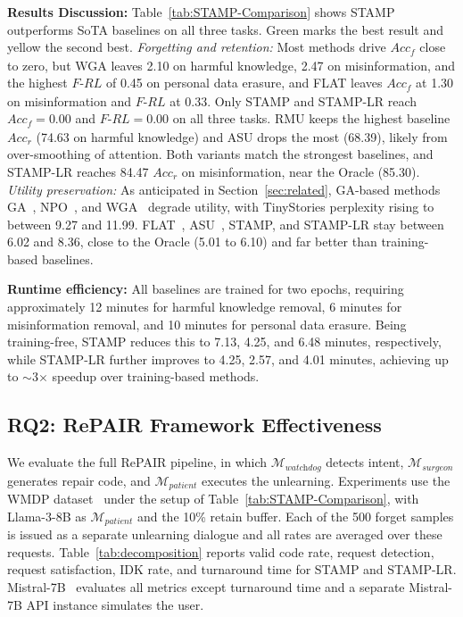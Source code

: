 \medskip
\noindent
\textbf{Results Discussion:}
Table~\ref{tab:STAMP-Comparison} shows STAMP outperforms SoTA baselines on all three tasks. \colorbox{green!30}{Green} marks the best result and \colorbox{yellow!40}{yellow} the second best.
\textit{Forgetting and retention:}
Most methods drive $Acc_\textit{f}$ close to zero, but WGA leaves 2.10 on harmful knowledge, 2.47 on misinformation, and the highest $F\text{-}RL$ of 0.45 on personal data erasure, and FLAT leaves $Acc_\textit{f}$ at 1.30 on misinformation and $F\text{-}RL$ at 0.33. Only STAMP and STAMP-LR reach $Acc_\textit{f} = 0.00$ and $F\text{-}RL = 0.00$ on all three tasks. RMU keeps the highest baseline $Acc_\textit{r}$ (74.63 on harmful knowledge) and ASU drops the most (68.39), likely from over-smoothing of attention. Both variants match the strongest baselines, and STAMP-LR reaches 84.47 $Acc_\textit{r}$ on misinformation, near the Oracle (85.30).
\textit{Utility preservation:}
As anticipated in Section~\ref{sec:related}, GA-based methods GA~\cite{yao2024large}, NPO~\cite{zhang2024negative}, and WGA~\cite{wang2025rethinking} degrade utility, with TinyStories perplexity rising to between 9.27 and 11.99. FLAT~\cite{wang2024llm}, ASU~\cite{zade2026attention}, STAMP, and STAMP-LR stay between 6.02 and 8.36, close to the Oracle (5.01 to 6.10) and far better than training-based baselines.

\noindent
\textbf{Runtime efficiency:}
All baselines are trained for two epochs, requiring approximately 12 minutes for harmful knowledge removal, 6 minutes for misinformation removal, and 10 minutes for personal data erasure. Being training-free, STAMP reduces this to 7.13, 4.25, and 6.48 minutes, respectively, while STAMP-LR further improves to 4.25, 2.57, and 4.01 minutes, achieving up to $\sim$3$\times$ speedup over training-based methods.

\subsection{RQ2: RePAIR Framework Effectiveness}

We evaluate the full RePAIR pipeline, in which $\mathcal{M}_{\textit{watchdog}}$ detects intent, $\mathcal{M}_{\textit{surgeon}}$ generates repair code, and $\mathcal{M}_{\textit{patient}}$ executes the unlearning. Experiments use the WMDP dataset~\cite{li2024wmdp} under the setup of Table~\ref{tab:STAMP-Comparison}, with Llama-3-8B as $\mathcal{M}_{\textit{patient}}$ and the 10\% retain buffer. Each of the 500 forget samples is issued as a separate unlearning dialogue and all rates are averaged over these requests. Table~\ref{tab:decomposition} reports valid code rate, request detection, request satisfaction, IDK rate, and turnaround time for STAMP and STAMP-LR. Mistral-7B~\cite{Jiang2023Mistral7} evaluates all metrics except turnaround time and a separate Mistral-7B API instance simulates the user.

